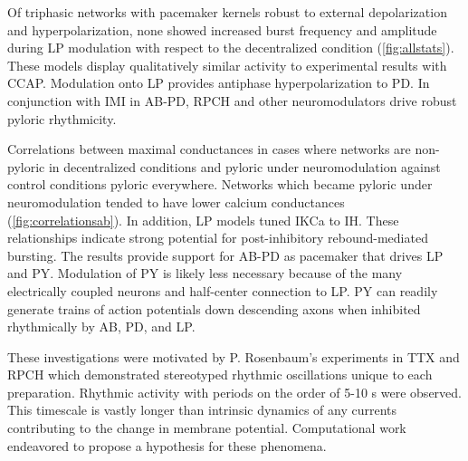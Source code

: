 Of triphasic networks with pacemaker kernels robust to external depolarization and hyperpolarization, none showed increased burst frequency and amplitude during \acs{LP} modulation with respect to the decentralized condition (\autoref{fig:allstats}). These models display qualitatively similar activity to experimental results with \acs{CCAP}\autocite{WeimannModulationOscillatorInteractions1997}. Modulation onto \acs{LP} provides antiphase hyperpolarization to \acs{PD}. In conjunction with \acs{IMI} in \acs{AB}-\acs{PD}, \acs{RPCH} and other neuromodulators drive robust pyloric rhythmicity.

Correlations between maximal conductances in cases where networks are non-pyloric in decentralized conditions and pyloric under neuromodulation against control conditions pyloric everywhere. Networks which became pyloric under neuromodulation tended to have lower calcium conductances (\autoref{fig:correlationsab}). In addition, \acs{LP} models tuned \acs{IKCa} to \acs{IH}. These relationships indicate strong potential for post-inhibitory rebound-mediated bursting. The results provide support for \acs{AB}-\acs{PD} as pacemaker that drives \acs{LP} and \acs{PY}. Modulation of \acs{PY} is likely less necessary because of the many electrically coupled neurons and half-center connection to \acs{LP}. \acs{PY} can readily generate trains of action potentials down descending axons when inhibited rhythmically by \acs{AB}, \acs{PD}, and \acs{LP}. 

These investigations were motivated by P. Rosenbaum's experiments in \acs{TTX} and \acs{RPCH} which demonstrated stereotyped rhythmic oscillations unique to each preparation. Rhythmic activity with periods on the order of 5-10 s were observed. This timescale is vastly longer than intrinsic dynamics of any currents contributing to the change in membrane potential. Computational work endeavored to propose a hypothesis for these phenomena.

